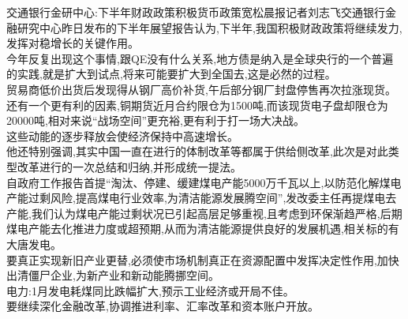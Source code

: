 \documentclass[runningheads,a4paper]{llncs}
\begin{document}
\begin{CJK*}{UTF8}{gbsn}
\colorbox{green!30}{交通银行金研中心}:下半年\colorbox{green!30}{财政政策}积极\colorbox{green!30}{货币政策}宽松\colorbox{green!30}{晨报记者刘志飞交通银行金融研究中心}昨日发布的\colorbox{green!30}{下半年展望报告}认为,下半年,我国积极\colorbox{green!30}{财政政策}将继续发力,发挥对\colorbox{red!30}{稳增长}的关键作用。\\
今年反复出现这个事情,跟\colorbox{green!30}{QE}没有什么关系,\colorbox{green!30}{地方债}是纳入是\colorbox{green!30}{全球央行}的一个普遍的实践,就是扩大到\colorbox{blue!30}{试点},将来可能要扩大到全国去,这是必然的过程。\\
\colorbox{green!30}{贸易商}低价出货后发现得从\colorbox{green!30}{钢厂}高价补货,午后部分\colorbox{green!30}{钢厂封盘停售}再次拉涨\colorbox{green!30}{现货}。\\
还有一个更有利的因素,\colorbox{green!30}{铜期货}近月\colorbox{green!30}{合约限仓}为1500吨,而该\colorbox{green!30}{现货电子盘}却\colorbox{green!30}{限仓}为20000吨,相对来说“战场空间”更充裕,更有利于打一场大决战。\\
这些\colorbox{blue!30}{动能}的逐步释放会使\colorbox{green!30}{经济}保持中高速增长。\\
他还特别强调,其实\colorbox{blue!30}{中国}一直在进行的\colorbox{green!30}{体制改革}等都属于\colorbox{green!30}{供给侧改革},此次是对此类型\colorbox{green!30}{改革}进行的一次总结和归纳,并形成统一提法。\\
自\colorbox{green!30}{政府工作报告}首提“淘汰、停建、缓建\colorbox{blue!30}{煤电产能}5000万千瓦以上,以防范化解\colorbox{green!30}{煤电产能过剩}\colorbox{blue!30}{风险},提高\colorbox{green!30}{煤电行业效率},为\colorbox{green!30}{清洁能源发展}腾空间”,\colorbox{red!30}{发改委主任}再提\colorbox{blue!30}{煤电去产能},我们认为\colorbox{green!30}{煤电产能过剩}\colorbox{blue!30}{状况}已引起\colorbox{red!30}{高层}足够重视,且考虑到环保渐趋严格,\colorbox{red!30}{后期}\colorbox{green!30}{煤电产能去化推进力度}或超预期,从而为\colorbox{green!30}{清洁能源}提供良好的发展机遇,相关\colorbox{blue!30}{标的}有\colorbox{green!30}{大唐发电}。\\
要真正实现\colorbox{blue!30}{新旧产业更替},必须使\colorbox{green!30}{市场机制}真正在\colorbox{green!30}{资源配置}中发挥决定性作用,加快出清\colorbox{green!30}{僵尸企业},为\colorbox{green!30}{新产业}和\colorbox{green!30}{新动能}腾挪空间。\\
\colorbox{blue!30}{电力}:1月\colorbox{blue!30}{发电耗煤同比跌幅}扩大,预示\colorbox{green!30}{工业经济}或开局不佳。\\
要继续深化\colorbox{green!30}{金融改革},协调推进\colorbox{green!30}{利率}、\colorbox{green!30}{汇率}\colorbox{red!30}{改革}和\colorbox{green!30}{资本账户}开放。\\

\end{CJK*}
\end{document}
